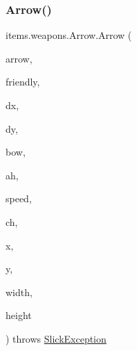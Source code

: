 \subsubsection{\texorpdfstring{Arrow()}{Arrow()}}
{\footnotesize\ttfamily items.\+weapons.\+Arrow.\+Arrow (\begin{DoxyParamCaption}\item[{\mbox{\hyperlink{classorg_1_1newdawn_1_1slick_1_1_image}{Image}}}]{arrow,  }\item[{Class}]{friendly,  }\item[{float}]{dx,  }\item[{float}]{dy,  }\item[{\mbox{\hyperlink{classitems_1_1weapons_1_1_bow}{Bow}}}]{bow,  }\item[{\mbox{\hyperlink{classitems_1_1weapons_1_1_arrow_handler}{Arrow\+Handler}}}]{ah,  }\item[{float}]{speed,  }\item[{\mbox{\hyperlink{classentities_1_1_collision_handler}{Collision\+Handler}}}]{ch,  }\item[{float}]{x,  }\item[{float}]{y,  }\item[{float}]{width,  }\item[{float}]{height }\end{DoxyParamCaption}) throws \mbox{\hyperlink{classorg_1_1newdawn_1_1slick_1_1_slick_exception}{Slick\+Exception}}\hspace{0.3cm}{\ttfamily [inline]}}


